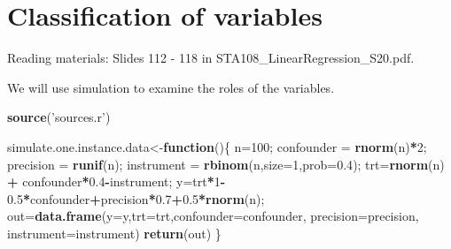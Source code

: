 \documentclass[12pt,]{book}
\newenvironment{Shaded}{\begin{snugshade}}{\end{snugshade}}
\newcommand{\KeywordTok}[1]{\textcolor[rgb]{0.13,0.29,0.53}{\textbf{#1}}}
\newcommand{\DataTypeTok}[1]{\textcolor[rgb]{0.13,0.29,0.53}{#1}}
\newcommand{\DecValTok}[1]{\textcolor[rgb]{0.00,0.00,0.81}{#1}}
\newcommand{\FloatTok}[1]{\textcolor[rgb]{0.00,0.00,0.81}{#1}}
\newcommand{\StringTok}[1]{\textcolor[rgb]{0.31,0.60,0.02}{#1}}
\newcommand{\CommentTok}[1]{\textcolor[rgb]{0.56,0.35,0.01}{\textit{#1}}}
\newcommand{\ControlFlowTok}[1]{\textcolor[rgb]{0.13,0.29,0.53}{\textbf{#1}}}
\newcommand{\OperatorTok}[1]{\textcolor[rgb]{0.81,0.36,0.00}{\textbf{#1}}}
\newcommand{\NormalTok}[1]{#1}
\begin{document}
\begin{Shaded}
\end{Shaded}

\section{Classification of variables}\label{classification-of-variables}

Reading materials: Slides 112 - 118 in
STA108\_LinearRegression\_S20.pdf.

We will use simulation to examine the roles of the variables.

\begin{Shaded}
\begin{Highlighting}[]
\KeywordTok{source}\NormalTok{(}\StringTok{'sources.r'}\NormalTok{)}

\NormalTok{simulate.one.instance.data<-}\ControlFlowTok{function}\NormalTok{()\{}
\NormalTok{n=}\DecValTok{100}\NormalTok{;}
\NormalTok{confounder =}\StringTok{ }\KeywordTok{rnorm}\NormalTok{(n)}\OperatorTok{*}\DecValTok{2}\NormalTok{;}
\NormalTok{precision =}\StringTok{ }\KeywordTok{runif}\NormalTok{(n);}
\NormalTok{instrument =}\StringTok{ }\KeywordTok{rbinom}\NormalTok{(n,}\DataTypeTok{size=}\DecValTok{1}\NormalTok{,}\DataTypeTok{prob=}\FloatTok{0.4}\NormalTok{);}
\NormalTok{trt=}\KeywordTok{rnorm}\NormalTok{(n) }\OperatorTok{+}\StringTok{ }\NormalTok{confounder}\OperatorTok{*}\FloatTok{0.4}\OperatorTok{-}\NormalTok{instrument;}
\NormalTok{y=trt}\OperatorTok{*}\DecValTok{1}\OperatorTok{-}\FloatTok{0.5}\OperatorTok{*}\NormalTok{confounder}\OperatorTok{+}\NormalTok{precision}\OperatorTok{*}\FloatTok{0.7}\OperatorTok{+}\FloatTok{0.5}\OperatorTok{*}\KeywordTok{rnorm}\NormalTok{(n);}
\NormalTok{out=}\KeywordTok{data.frame}\NormalTok{(}\DataTypeTok{y=}\NormalTok{y,}\DataTypeTok{trt=}\NormalTok{trt,}\DataTypeTok{confounder=}\NormalTok{confounder, }\DataTypeTok{precision=}\NormalTok{precision, }\DataTypeTok{instrument=}\NormalTok{instrument)}
\KeywordTok{return}\NormalTok{(out)}
\NormalTok{\}}
\end{Highlighting}
\end{Shaded}
\end{document}
